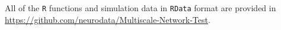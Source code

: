 \documentclass[11pt]{article}
\theoremstyle{definition}
\begin{document}
All of the \texttt{R} functions and simulation data in \texttt{RData} format are provided in \url{https://github.com/neurodata/Multiscale-Network-Test}.

	
\end{document}
